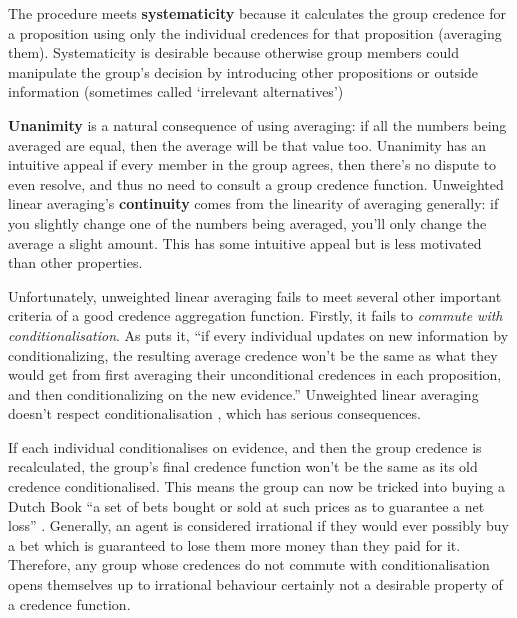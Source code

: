 \documentclass{article}
\begin{document}
The procedure meets \textbf{systematicity} because it calculates the group credence for a proposition using only the individual credences for that proposition (averaging them). Systematicity is desirable because otherwise group members could manipulate the group's decision by introducing other propositions or outside information (sometimes called `irrelevant alternatives')

\textbf{Unanimity} is a natural consequence of using averaging: if all the numbers being averaged are equal, then the average will be that value too. Unanimity has an intuitive appeal \textemdash{} if every member in the group agrees, then there's no dispute to even resolve, and thus no need to consult a group credence function. Unweighted linear averaging's \textbf{continuity} comes from the linearity of averaging generally: if you slightly change one of the numbers being averaged, you'll only change the average a slight amount. This has some intuitive appeal but is less motivated than other properties.

Unfortunately, unweighted linear averaging fails to meet several other important criteria of a good credence aggregation function. Firstly, it fails to \textit{commute with conditionalisation}. As \citet[pg. 1290]{russell2015groupthink} puts it, ``if every individual updates on new information by conditionalizing, the resulting average credence won’t be the same as what they would get from first averaging their unconditional credences in each proposition, and then conditionalizing on the new evidence.'' Unweighted linear averaging doesn't respect conditionalisation \citep[pg. 87]{loewer1985destroying}, which has serious consequences.

If each individual conditionalises on evidence, and then the group credence is recalculated, the group's final credence function won't be the same as its old credence conditionalised. This means the group can now be tricked into buying a Dutch Book \textemdash{} ``a set of bets bought or sold at such prices as to guarantee a net loss'' \citep{hajek2008dutch}. Generally, an agent is considered irrational if they would ever possibly buy a bet which is guaranteed to lose them more money than they paid for it. Therefore, any group whose credences do not commute with conditionalisation opens themselves up to irrational behaviour \textemdash{} certainly not a desirable property of a credence function.
\end{document}
